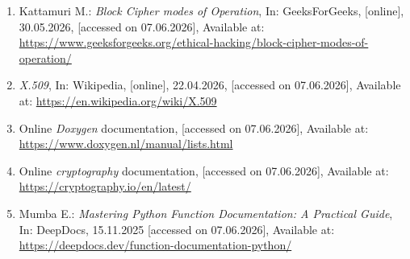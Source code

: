 \documentclass[12pt, a4paper]{report}
\begin{document}
\begin{enumerate}
\item Kattamuri M.: \textit{Block Cipher modes of Operation}, In: GeeksForGeeks, [online], 30.05.2026, [accessed on 07.06.2026], Available at: \url{https://www.geeksforgeeks.org/ethical-hacking/block-cipher-modes-of-operation/}

\item \textit{X.509}, In: Wikipedia, [online], 22.04.2026, [accessed on 07.06.2026], Available at: \url{https://en.wikipedia.org/wiki/X.509}

\item Online \textit{Doxygen} documentation, [accessed on 07.06.2026], Available at: \url{https://www.doxygen.nl/manual/lists.html}

\item Online \textit{cryptography} documentation, [accessed on 07.06.2026], Available at: \url{https://cryptography.io/en/latest/}

\item Mumba E.: \textit{Mastering Python Function Documentation: A Practical Guide}, In: DeepDocs, 15.11.2025 [accessed on 07.06.2026], Available at: \url{https://deepdocs.dev/function-documentation-python/}

\end{enumerate}
\end{document}
